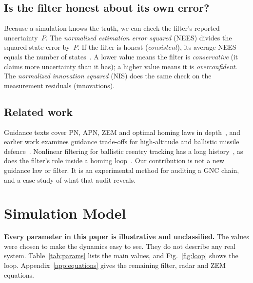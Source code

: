 \documentclass[conference,letterpaper]{IEEEtran}
\begin{document}
\subsection{Is the filter honest about its own error?}

Because a simulation knows the truth, we can check the filter's reported uncertainty~$P$.
The \emph{normalized estimation error squared} (NEES) divides the squared state error by~$P$.
If the filter is honest (\emph{consistent}), its average NEES equals the number of states~\cite{barshalom2001}.
A lower value means the filter is \emph{conservative} (it claims more uncertainty than it has); a higher value means it is \emph{overconfident}.
The \emph{normalized innovation squared} (NIS) does the same check on the measurement residuals (innovations).

\subsection{Related work}

Guidance texts cover PN, APN, ZEM and optimal homing laws in depth~\cite{shneydor1998,palumbo2010modern,zarchan2012}, and earlier work examines guidance trade-offs for high-altitude and ballistic missile defence~\cite{nesline1983,zarchan1999}.
Nonlinear filtering for ballistic reentry tracking has a long history~\cite{mehra1971,farina2002,zarchan2009kalman,li2010survey}, as does the filter's role inside a homing loop~\cite{palumbo2010filter}.
Our contribution is not a new guidance law or filter.
It is an experimental method for auditing a GNC chain, and a case study of what that audit reveals.

\section{Simulation Model}
\label{sec:model}

\textbf{Every parameter in this paper is illustrative and unclassified.}
The values were chosen to make the dynamics easy to see.
They do not describe any real system.
Table~\ref{tab:params} lists the main values, and Fig.~\ref{fig:loop} shows the loop.
Appendix~\ref{app:equations} gives the remaining filter, radar and ZEM equations.
\end{document}

